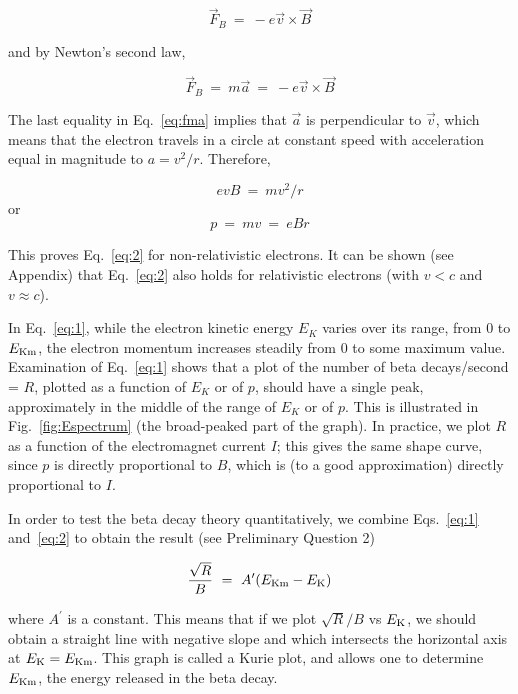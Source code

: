 \begin{equation}
\vec{F}_B~=~ - e \vec{v} \times \vec{B}
\end{equation}

and by Newton's second law,

\begin{equation}
\vec{F}_B~=~ m \vec{a} ~=~ - e \vec{v} \times \vec{B}
\label{eq:fma}
\end{equation}

The last equality in Eq.~\ref{eq:fma} implies that $\vec{a}$ is
perpendicular to $\vec{v}$, which means
that the electron travels in a circle at constant speed with
acceleration equal in magnitude to $a = v^2/r$.
Therefore,

\begin{equation}
evB~=~mv^2/r
\end{equation}
or
\begin{equation}
p~=~mv~=~eBr
\end{equation}

This proves Eq.~\ref{eq:2} for non-relativistic electrons.  It can be
shown (see Appendix) that Eq.~\ref{eq:2} also holds for relativistic electrons
(with $v < c$  and $v \approx c$).

In Eq.~\ref{eq:1}, while the electron kinetic energy
$E_K$ varies over its range, from 0 to
$E_{\rm Km}$, the electron  momentum
increases steadily from 0 to some maximum value.  Examination of Eq.~\ref{eq:1}
shows that a plot of the number of beta decays/second = $R$, plotted
as a function of $E_K$ or of $p$, should
have a single peak, approximately in the middle of the range of
$E_K$ or of $p$.  This is illustrated in
Fig.~\ref{fig:Espectrum} (the broad-peaked part of the graph).  In practice, we plot $R$
as a function of the electromagnet current $I$; this gives the same shape
curve, since $p$ is directly proportional to $B$, which is (to a good
approximation) directly proportional to $I$.

In order to test the beta decay theory quantitatively, we combine Eqs.~\ref{eq:1} and~\ref{eq:2}
to obtain the result (see Preliminary Question 2)

\begin{equation}
{\sqrt{R} \over B}~=~A^\prime (E_{\rm Km} - E_{\rm K})
\label{eq:kurie}
\end{equation}

where $A^\prime$ is a constant.  This means that if we
plot $\sqrt{R}/B$ vs $E_{\rm K}$, we should obtain a straight line
with negative slope and which intersects the horizontal axis at
$E_{\rm K} = E_{\rm Km}$.  This graph is called a Kurie
plot, and allows one to determine $E_{\rm Km}$, the energy released in the beta decay.

